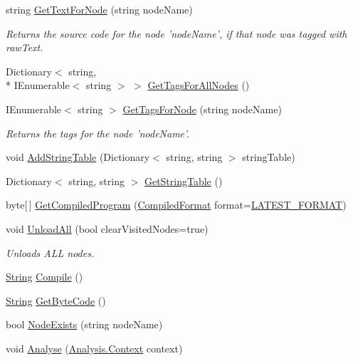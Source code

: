 \begin{DoxyCompactItemize}
\item 
string \hyperlink{a00094_a594641914a2b59cc5231645273d18e82}{Get\-Text\-For\-Node} (string node\-Name)
\begin{DoxyCompactList}\small\item\em Returns the source code for the node 'node\-Name', if that node was tagged with raw\-Text. \end{DoxyCompactList}\item 
Dictionary$<$ string, \\*
I\-Enumerable$<$ string $>$ $>$ \hyperlink{a00094_a20ef38a17e4a346de3b572b85052c1d1}{Get\-Tags\-For\-All\-Nodes} ()
\item 
I\-Enumerable$<$ string $>$ \hyperlink{a00094_ab85166316a6c5aadce336316406ed164}{Get\-Tags\-For\-Node} (string node\-Name)
\begin{DoxyCompactList}\small\item\em Returns the tags for the node 'node\-Name'. \end{DoxyCompactList}\item 
void \hyperlink{a00094_acfb8561e08dc85c6d9a855ad07d18783}{Add\-String\-Table} (Dictionary$<$ string, string $>$ string\-Table)
\item 
Dictionary$<$ string, string $>$ \hyperlink{a00094_af5fe57ebd11c41208070972f06a31b9d}{Get\-String\-Table} ()
\item 
byte\mbox{[}$\,$\mbox{]} \hyperlink{a00094_a5b664d4bbe7c47c246fe0beca9648687}{Get\-Compiled\-Program} (\hyperlink{a00094_a903f18cdcc66c28ceab5a43c41fe074d}{Compiled\-Format} format=\hyperlink{a00094_a3bc83587462ade6a2f7f42cb7576e50e}{L\-A\-T\-E\-S\-T\-\_\-\-F\-O\-R\-M\-A\-T})
\item 
void \hyperlink{a00094_a7acfe32f91b36ee812059f2ad3011133}{Unload\-All} (bool clear\-Visited\-Nodes=true)
\begin{DoxyCompactList}\small\item\em Unloads A\-L\-L nodes. \end{DoxyCompactList}\item 
\hyperlink{a00053_a301aa7c866593a5b625a8fc158bbeacea27118326006d3829667a400ad23d5d98}{String} \hyperlink{a00094_a7a8a3a461011172f5624da3a8ffa875f}{Compile} ()
\item 
\hyperlink{a00053_a301aa7c866593a5b625a8fc158bbeacea27118326006d3829667a400ad23d5d98}{String} \hyperlink{a00094_aade6c069db8f01572060d25a963d2a14}{Get\-Byte\-Code} ()
\item 
bool \hyperlink{a00094_a93bb76a1f9a4058f225ff4cee97483c6}{Node\-Exists} (string node\-Name)
\item 
void \hyperlink{a00094_a6b67b239f50c062160666e54592c433f}{Analyse} (\hyperlink{a00059}{Analysis.\-Context} context)
\end{DoxyCompactItemize}
